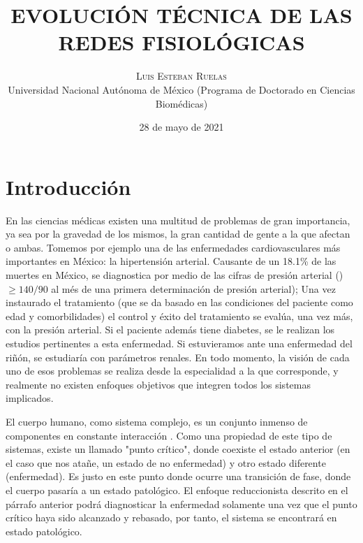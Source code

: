 \documentclass[twoside,twocolumn]{article}
\title{EVOLUCIÓN TÉCNICA DE LAS REDES FISIOLÓGICAS} %
\author{%
\textsc{Luis Esteban Ruelas} \\[1ex] %
\normalsize Universidad Nacional Autónoma de México
 (Programa de Doctorado en Ciencias Biomédicas)\\ %
}
\date{28 de mayo de 2021} %
\begin{document}
\renewcommand{\abstractname}{Resumen}
\renewcommand{\figurename}{Figura}
\maketitle


\section{Introducción}
En las ciencias médicas existen una multitud de problemas de gran importancia, ya sea por la gravedad de los mismos, la gran cantidad de gente a la que afectan o ambas.
Tomemos por ejemplo una de las enfermedades cardiovasculares más importantes en México: la hipertensión arterial.
Causante de un 18.1\% de las muertes en México\cite{campos2018hipertension}, se diagnostica por medio de las cifras de presión arterial ()$\geq140/90$ al més de una primera determinación de presión arterial\cite{de2008diagnostico});
Una vez instaurado el tratamiento (que se da basado en las condiciones del paciente como edad y comorbilidades) el control y éxito del tratamiento se evalúa, una vez más, con la presión arterial.
Si el paciente además tiene diabetes, se le realizan los estudios pertinentes a esta enfermedad. Si estuvieramos ante una enfermedad del riñón, se estudiaría con parámetros renales. En todo momento, la visión de cada uno de esos problemas se realiza desde la especialidad a la que corresponde, y realmente no existen enfoques objetivos que integren todos los sistemas implicados.

El cuerpo humano, como sistema complejo, es un conjunto inmenso de componentes en constante interacción \cite{engel2010thermodynamics}.
Como una propiedad de este tipo de sistemas, existe un llamado "punto crítico", donde coexiste el estado anterior (en el caso que nos atañe, un estado de no enfermedad) y otro estado diferente (enfermedad).
Es justo en este punto donde ocurre una transición de fase, donde el cuerpo pasaría a un estado patológico.
El enfoque reduccionista descrito en el párrafo anterior podrá diagnosticar la enfermedad solamente una vez que el punto crítico haya sido alcanzado y rebasado, por tanto, el sistema se encontrará en estado patológico.
\end{document}
